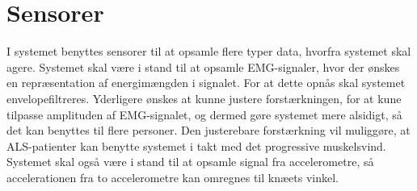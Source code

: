 \section{Sensorer} \label{sec:sensorer}
I systemet benyttes sensorer til at opsamle flere typer data, hvorfra systemet skal agere. Systemet skal være i stand til at opsamle EMG-signaler, hvor der ønskes en repræsentation af energimængden i signalet. For at dette opnås skal systemet envelopefiltreres. Yderligere ønskes at kunne justere forstærkningen, for at kune tilpasse amplituden af EMG-signalet, og dermed gøre systemet mere alsidigt, så det kan benyttes til flere personer. Den justerebare forstærkning vil muliggøre, at ALS-patienter kan benytte systemet i takt med det progressive muskelsvind.
Systemet skal også være i stand til at opsamle signal fra accelerometre, så accelerationen fra to accelerometre kan omregnes til knæets vinkel. 